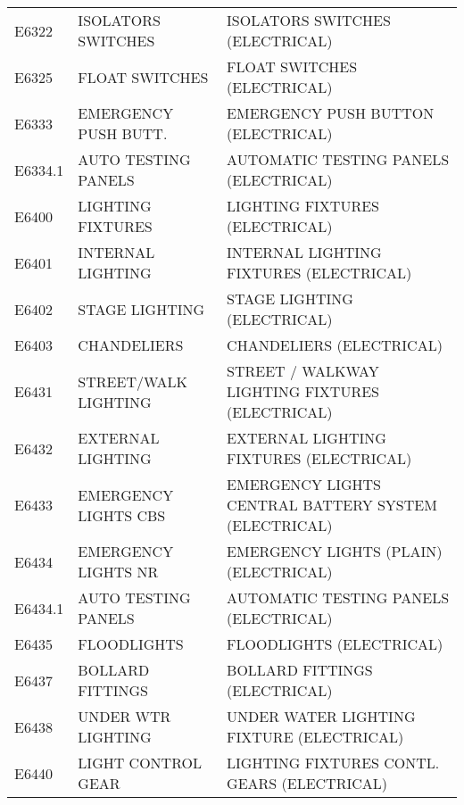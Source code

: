 \begin{longtable}[l]{l%
                  l|%
                  l|}
\rowcolor{thetableheadbgcolor!0.25!white} E6322       & ISOLATORS SWITCHES   & ISOLATORS SWITCHES (ELECTRICAL)   \\
\rowcolor{thetableheadbgcolor!0.25!white} E6325       & FLOAT SWITCHES   & FLOAT SWITCHES (ELECTRICAL)   \\
\rowcolor{thetableheadbgcolor!0.25!white} E6333       & EMERGENCY PUSH BUTT.   & EMERGENCY PUSH BUTTON (ELECTRICAL)   \\
\rowcolor{thetableheadbgcolor!0.25!white} E6334.1     & AUTO TESTING PANELS   & AUTOMATIC TESTING PANELS (ELECTRICAL)   \\
\rowcolor{thetableheadbgcolor!0.25!white} E6400       & LIGHTING FIXTURES   & LIGHTING FIXTURES (ELECTRICAL)   \\
\rowcolor{thetableheadbgcolor!0.25!white} E6401       & INTERNAL LIGHTING   & INTERNAL LIGHTING FIXTURES (ELECTRICAL)   \\
\rowcolor{thetableheadbgcolor!0.25!white} E6402       & STAGE LIGHTING   & STAGE LIGHTING (ELECTRICAL)   \\
\rowcolor{thetableheadbgcolor!0.25!white} E6403       & CHANDELIERS   & CHANDELIERS (ELECTRICAL)   \\
\rowcolor{thetableheadbgcolor!0.25!white} E6431       & STREET/WALK LIGHTING   & STREET / WALKWAY LIGHTING FIXTURES (ELECTRICAL)   \\
\rowcolor{thetableheadbgcolor!0.25!white} E6432       & EXTERNAL LIGHTING   & EXTERNAL LIGHTING FIXTURES (ELECTRICAL)   \\
\rowcolor{thetableheadbgcolor!0.25!white} E6433       & EMERGENCY LIGHTS CBS   & EMERGENCY LIGHTS CENTRAL BATTERY SYSTEM (ELECTRICAL)   \\
\rowcolor{thetableheadbgcolor!0.25!white} E6434       & EMERGENCY LIGHTS NR   & EMERGENCY LIGHTS (PLAIN) (ELECTRICAL)   \\
\rowcolor{thetableheadbgcolor!0.25!white} E6434.1     & AUTO TESTING PANELS   & AUTOMATIC TESTING PANELS (ELECTRICAL)   \\
\rowcolor{thetableheadbgcolor!0.25!white} E6435       & FLOODLIGHTS   & FLOODLIGHTS (ELECTRICAL)   \\
\rowcolor{thetableheadbgcolor!0.25!white} E6437       & BOLLARD FITTINGS   & BOLLARD FITTINGS (ELECTRICAL)   \\
\rowcolor{thetableheadbgcolor!0.25!white} E6438       & UNDER WTR LIGHTING   & UNDER WATER LIGHTING FIXTURE (ELECTRICAL)   \\
\rowcolor{thetableheadbgcolor!0.25!white} E6440       & LIGHT CONTROL GEAR   & LIGHTING FIXTURES CONTL. GEARS (ELECTRICAL)   \\

\end{longtable}
